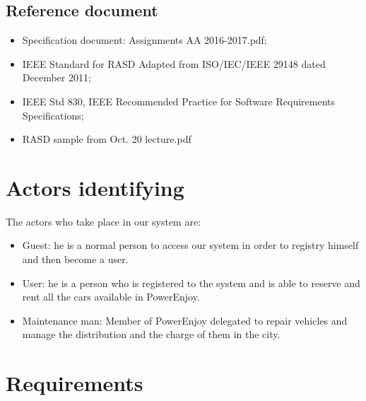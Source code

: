 \documentclass[10pt, a4paper,titlepage]{article}
\begin{document}
\subsection{Reference document}
\begin{itemize}
\item Specification document: Assignments AA 2016-2017.pdf;
\item IEEE Standard for RASD Adapted from ISO/IEC/IEEE 29148 dated December 2011;
\item IEEE Std 830, IEEE Recommended Practice for Software Requirements Specifications;
\item RASD sample from Oct. 20 lecture.pdf
\end{itemize}
\section{Actors identifying}
The actors who take place in our system are:
\begin{itemize}
\item Guest: he is a normal person to access our system in order to registry himself and then become a user.
\item User: he is a person who is registered to the system and is able to reserve and rent all the cars available in PowerEnjoy.
\item Maintenance man: Member of PowerEnjoy delegated to repair vehicles and manage the distribution and the charge of them in the city.
\end{itemize}
\section{Requirements}
\end{document}
